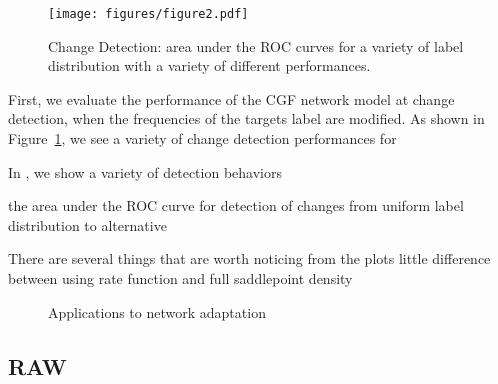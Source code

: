 \documentclass{article}      %
\begin{document}
\begin{figure}[tbh]
  \centering
  \texttt{[image: figures/figure2.pdf]}
  \caption{Change Detection: area under the ROC curves for a variety of label distribution with a variety of different performances.}
  \label{fig:2_change_detection}
\end{figure}

First, we evaluate the performance of the CGF network model at change detection, when the frequencies of the targets label are modified.
As shown in Figure~\ref{fig:2_change_detection}, we see a variety of change detection performances for 



In , we show a variety of detection behaviors 


the area under the ROC curve for detection of changes from uniform label distribution to alternative


There are several things that are worth noticing from the plots
little difference between using rate function and full saddlepoint density










\begin{figure}[tb]
  \centering
  \begin{subfigure}[t]{\textwidth}
    \centering
    \caption{}
    \label{fig:3a_adaptation_example}
  \end{subfigure}

  \caption{Applications to network adaptation }
  \label{fig:3_adaptation_example}
\end{figure}




\newpage
\subsection{RAW}
\end{document}
